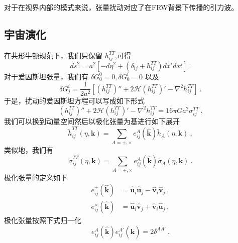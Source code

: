 
\begin{issues}
\issueNeedCite
\issueMissDepend
\end{issues}

对于在视界内部的模式来说，张量扰动对应了在FRW背景下传播的引力波。

\subsection{宇宙演化}
在共形牛顿规范下，我们只保留 $h_{ij}^{TT}$,可得
\begin{equation}
ds^2 = a^2[-d  \eta^2+(\delta_{ij}+h_{ij}^{TT})dx^i dx^j ]~.
\end{equation}
对于爱因斯坦张量，我们有 $\delta G^0_0 = 0, \delta G^i_0 = 0$ 以及
\begin{equation}
\delta G^i_j = \frac{1}{2 a^2} [ (h_{ij}^{TT}  )'' + 2\mathcal H (h_{ij}^{TT})' - \nabla^2 h_{ij}^{TT}  ]~.
\end{equation}
于是，扰动的爱因斯坦方程可以写成如下形式
\begin{equation}\label{eq_TenPT_1}
(h_{ij}^{TT})'' + 2 \mathcal H (h_{ij}^{TT})' - \nabla^2 h_{ij}^{TT} = 16 \pi G a^2 \sigma_{ij}^{TT} ~.
\end{equation}
我们可以换到动量空间然后以极化张量为基进行如下展开
\begin{equation}
\tilde h_{ij}^{TT} (\eta,\mathbf k) = \sum_{A = +,\times} e^A_{ij} (\hat{\mathbf k}) \tilde h_A (\eta,\mathbf k)~, 
\end{equation}
类似地，我们有
\begin{equation}
\tilde \sigma_{ij}^{TT} (\eta,\mathbf k) = \sum_{A = +,\times} e^A_{ij} (\hat{\mathbf k}) \tilde \sigma_A (\eta,\mathbf k) ~.
\end{equation}
极化张量的定义如下
\begin{equation}
\begin{aligned}
e^+_{ij}(\hat{\mathbf k}) & = \hat{\mathbf u}_i \hat{\mathbf u}_j - \hat{\mathbf v}_i \hat{\mathbf v}_j ~, \\
e^\times_{ij} (\hat{\mathbf k}) & = \hat{\mathbf u}_i 
\hat{\mathbf v}_j + \hat{\mathbf v}_i \hat{\mathbf u}_j~,
\end{aligned}
\end{equation}
极化张量按照下式归一化
\begin{equation}
e^A_{ij} (\hat{\mathbf k}) e^{A'}_{ij} (\hat{\mathbf k}) = 2 \delta^{AA'} ~.
\end{equation}
